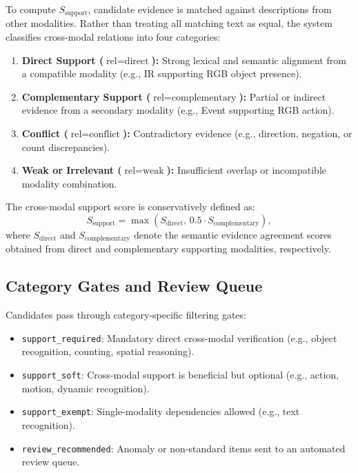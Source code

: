 To compute $S_{\text{support}}$, candidate evidence is matched against descriptions from other modalities.
Rather than treating all matching text as equal, the system classifies cross-modal relations into four categories:
\begin{enumerate}
    \item \textbf{Direct Support ($\text{rel} = \text{direct}$):} Strong lexical and semantic alignment from a compatible modality (e.g., IR supporting RGB object presence).
    \item \textbf{Complementary Support ($\text{rel} = \text{complementary}$):} Partial or indirect evidence from a secondary modality (e.g., Event supporting RGB action).
    \item \textbf{Conflict ($\text{rel} = \text{conflict}$):} Contradictory evidence (e.g., direction, negation, or count discrepancies).
    \item \textbf{Weak or Irrelevant ($\text{rel} = \text{weak}$):} Insufficient overlap or incompatible modality combination.
\end{enumerate}
The cross-modal support score is conservatively defined as:
\begin{equation}
    S_{\text{support}} = \max\left(S_{\text{direct}},\, 0.5 \cdot S_{\text{complementary}}\right),
    \label{eq:support_score}
\end{equation}
where $S_{\text{direct}}$ and $S_{\text{complementary}}$ denote the semantic evidence agreement scores obtained from direct and complementary supporting modalities, respectively.

\subsection{Category Gates and Review Queue}

Candidates pass through category-specific filtering gates:
\begin{itemize}
    \item \texttt{support\_required}: Mandatory direct cross-modal verification (e.g., object recognition, counting, spatial reasoning).
    \item \texttt{support\_soft}: Cross-modal support is beneficial but optional (e.g., action, motion, dynamic recognition).
    \item \texttt{support\_exempt}: Single-modality dependencies allowed (e.g., text recognition).
    \item \texttt{review\_recommended}: Anomaly or non-standard items sent to an automated review queue.
\end{itemize}

